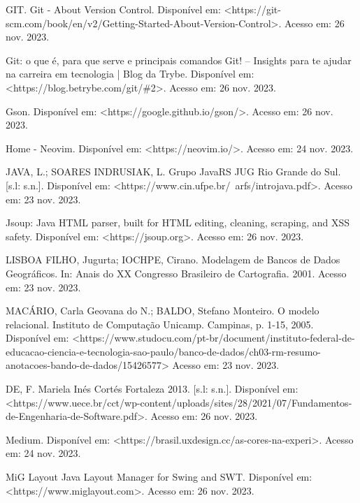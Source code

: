 \documentclass[a4paper,12pt]{article}
\begin{document}
\noindent GIT. Git - About Version Control. Disponível em: <https://git-scm.com/book/en/v2/Getting-Started-About-Version-Control>.
‌Acesso em: 26 nov. 2023. \linebreak

\noindent Git: o que é, para que serve e principais comandos Git! – Insights para te ajudar na carreira em tecnologia | Blog da Trybe. 
Disponível em: <https://blog.betrybe.com/git/\#2>. Acesso em: 26 nov. 2023.

\noindent Gson. Disponível em: <https://google.github.io/gson/>. Acesso em: 26 nov. 2023. \linebreak

\noindent Home - Neovim. Disponível em: <https://neovim.io/>. Acesso em: 24 nov. 2023. \linebreak

\noindent JAVA, L.; SOARES INDRUSIAK, L. Grupo JavaRS JUG Rio Grande do Sul. [s.l: s.n.]. 
Disponível em: <https://www.cin.ufpe.br/~arfs/introjava.pdf>. Acesso em: 23 nov. 2023. \linebreak

\noindent Jsoup: Java HTML parser, built for HTML editing, cleaning, scraping, and XSS safety. Disponível em: <https://jsoup.org>.
Acesso em: 26 nov. 2023. \linebreak

\noindent LISBOA FILHO, Jugurta; IOCHPE, Cirano. Modelagem de Bancos de Dados Geográficos. In: Anais do XX Congresso Brasileiro de Cartografia. 2001. Acesso em: 23 nov. 2023. \linebreak

\noindent MACÁRIO, Carla Geovana do N.; BALDO, Stefano Monteiro. O modelo relacional. Instituto de Computação Unicamp. Campinas, p. 1-15, 2005. 
Disponível em: <https://www.studocu.com/pt-br/document/instituto-federal-de-educacao-ciencia-e-tecnologia-sao-paulo/banco-de-dados/ch03-rm-resumo-anotacoes-bando-de-dados/15426577> 
Acesso em: 23 nov. 2023. \linebreak

\noindent DE, F. Mariela Inés Cortés Fortaleza 2013. [s.l: s.n.]. 
Disponível em: <https://www.uece.br/cct/wp-content/uploads/sites/28/2021/07/Fundamentos-de-Engenharia-de-Software.pdf>. 
Acesso em: 26 nov. 2023. \linebreak

\noindent Medium. Disponível em: <https://brasil.uxdesign.cc/as-cores-na-experi>. Acesso em: 24 nov. 2023. \linebreak

\noindent MiG Layout Java Layout Manager for Swing and SWT. Disponível em: <https://www.miglayout.com>. Acesso em: 26 nov. 2023. \linebreak
\end{document}
